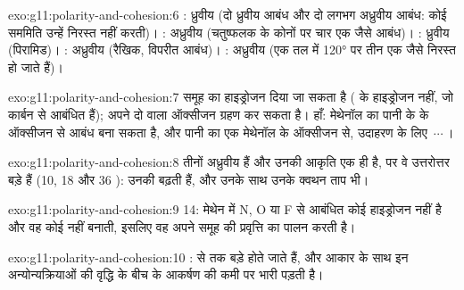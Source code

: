 \begin{solution}{exo:g11:polarity-and-cohesion:6}
: ध्रुवीय (दो ध्रुवीय  आबंध और दो लगभग अध्रुवीय
 आबंध: कोई सममिति उन्हें निरस्त नहीं करती)। : अध्रुवीय (चतुष्फलक
के कोनों पर चार एक जैसे आबंध)। : ध्रुवीय
(पिरामिड)। : अध्रुवीय (रैखिक, विपरीत आबंध)। :
अध्रुवीय (एक तल में \ang{120} पर तीन एक जैसे  निरस्त हो जाते हैं)।
\end{solution}

\begin{solution}{exo:g11:polarity-and-cohesion:7}
 समूह का हाइड्रोजन दिया जा सकता है ( के हाइड्रोजन नहीं,
जो कार्बन से आबंधित हैं); अपने दो  वाला ऑक्सीजन 
ग्रहण कर सकता है। हाँ: मेथेनॉल का  पानी के  के ऑक्सीजन से आबंध बना
सकता है, और पानी का एक  मेथेनॉल के ऑक्सीजन से, उदाहरण के लिए
\,$\cdots$\,।
\end{solution}

\begin{solution}{exo:g11:polarity-and-cohesion:8}
तीनों  अध्रुवीय हैं और उनकी आकृति एक ही है, पर वे उत्तरोत्तर
बड़े हैं (10, 18 और 36 ): उनकी  बढ़ती हैं,
और उनके साथ उनके क्वथन ताप भी।
\end{solution}

\begin{solution}{exo:g11:polarity-and-cohesion:9}
 14: मेथेन में N, O या F से आबंधित कोई हाइड्रोजन नहीं है और वह कोई
 नहीं बनाती, इसलिए वह अपने समूह की प्रवृत्ति का पालन करती है।
\end{solution}

\begin{solution}{exo:g11:polarity-and-cohesion:10}
:  से  तक  बड़े होते जाते
हैं, और आकार के साथ इन अन्योन्यक्रियाओं की वृद्धि  के बीच के
आकर्षण की कमी पर भारी पड़ती है।
\end{solution}

